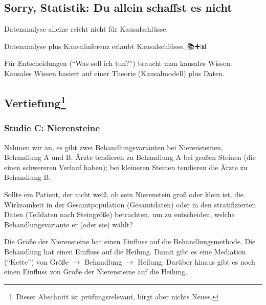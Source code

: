 \documentclass[
  ngerman,
  letterpaper,
  twoside,
  open=any]{scrbook}
\theoremstyle{definition}
\theoremstyle{plain}
\theoremstyle{definition}
\theoremstyle{definition}
\theoremstyle{definition}
\theoremstyle{definition}
\theoremstyle{remark}
\begin{document}
\subsection{Sorry, Statistik: Du allein schaffst es
nicht}\label{sorry-statistik-du-allein-schaffst-es-nicht-1}

Datenanalyse alleine reicht nicht für Kausalschlüsse. 🧟

Datenanalyse plus Kausalinferenz erlaubt Kausalschlüsse. 📚➕📊 🟰 🤩

\begin{tcolorbox}[enhanced jigsaw, arc=.35mm, bottomrule=.15mm, bottomtitle=1mm, breakable, colback=white, colbacktitle=quarto-callout-important-color!10!white, colframe=quarto-callout-important-color-frame, coltitle=black, left=2mm, leftrule=.75mm, opacityback=0, opacitybacktitle=0.6, rightrule=.15mm, title=\textcolor{quarto-callout-important-color}{\faExclamation}\hspace{0.5em}{Wichtig}, titlerule=0mm, toprule=.15mm, toptitle=1mm]

Für Entscheidungen (\enquote{Was soll ich tun?}) braucht man kausales
Wissen. Kausales Wissen basiert auf einer Theorie (Kausalmodell) plus
Daten.

\end{tcolorbox}

\subsection[Vertiefung]{\texorpdfstring{Vertiefung\footnote{Dieser
  Abschnitt ist prüfungsrelevant, birgt aber nichts Neues.}}{Vertiefung}}\label{vertiefung-5}

\subsubsection{Studie C: Nierensteine}\label{studie-c-nierensteine}

Nehmen wir an, es gibt zwei Behandlungsvarianten bei Nierensteinen,
Behandlung A und B. Ärzte tendieren zu Behandlung A bei großen Steinen
(die einen schwereren Verlauf haben); bei kleineren Steinen tendieren
die Ärzte zu Behandlung B.

Sollte ein Patient, der nicht weiß, ob sein Nierenstein groß oder klein
ist, die Wirksamkeit in der Gesamtpopulation (Gesamtdaten) oder in den
stratifizierten Daten (Teildaten nach Steingröße) betrachten, um zu
entscheiden, welche Behandlungsvariante er (oder sie) wählt?

Die Größe der Nierensteine hat einen Einfluss auf die
Behandlungsmethode. Die Behandlung hat einen Einfluss auf die Heilung.
Damit gibt es eine Mediation (\enquote{Kette}) von Größe \(\rightarrow\)
Behandlung \(\rightarrow\) Heilung. Darüber hinaus gibt es noch einen
Einfluss von Größe der Nierensteine auf die Heilung.
\end{document}

